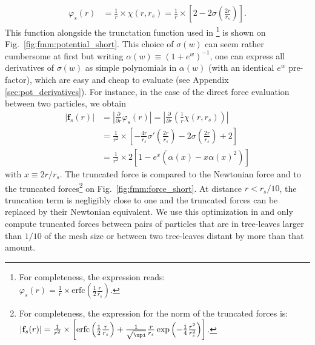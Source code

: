 \begin{align}
  \varphi_s(r) &= \frac{1}{r} \times \chi(r, r_s) = \frac{1}{r}\times\left[2 - 2\sigma\left(\frac{2r}{r_s}\right)\right].%
\end{align}
This function alongside the trunctation function used in
\gadget\footnote{For completeness, the \gadget expression reads:\\
 $\varphi_s(r) = \frac{1}{r} \times \mathrm{erfc}(\frac{1}{2}\frac{r}{r_s})$.} is shown
on Fig.~\ref{fig:fmm:potential_short}. This choice of $\sigma(w)$ can
seem rather cumbersome at first but writing
$\alpha(w) \equiv (1+e^w)^{-1}$, one can express all derivatives of
$\sigma(w)$ as simple polynomials in $\alpha(w)$ (with an identical
$e^w$ pre-factor), which are easy and cheap to evaluate (see Appendix
\ref{sec:pot_derivatives}). For instance, in the case of the direct
force evaluation between two particles, we obtain
\begin{align}
  |\mathbf{f}_s(r)| &= \left|\frac{\partial}{\partial r}\varphi_s(r)\right|
                      = \left|\frac{\partial}{\partial r}\left(\frac{1}{r} \chi(r, r_s)\right) \right|\nonumber \\
  &=  \frac{1}{r^2}\times\left[-\frac{4r}{r_s}\sigma'\left(\frac{2r}{r_s}\right) -
    2\sigma\left(\frac{2r}{r_s}\right) + 2\right] \nonumber \\
  &=
    \frac{1}{r^2}\times 2 \left[1 - e^x\left(\alpha(x) - x\alpha(x)^2\right) \right]
\end{align}
with $x\equiv2r/r_s$. The truncated force is compared to the Newtonian
force and to the \gadget truncated forces\footnote{For completeness,
  the \gadget expression for the norm of the truncated forces is:
  $|\mathbf{f}_s(r)| = \frac{1}{r^2} \times
  \left[\mathrm{erfc}\left(\frac{1}{2}\frac{r}{r_s}\right) +
    \frac{1}{\sqrt{\upi}}\frac{r}{r_s}\exp\left(-\frac{1}{4}\frac{r^2}{r_s^2}\right)\right]$.}
on Fig.~\ref{fig:fmm:force_short}. At distance $r<r_s/10$, the
truncation term is negligibly close to one and the truncated forces
can be replaced by their Newtonian equivalent. We use this
optimization in \swift and only compute truncated forces between pairs
of particles that are in tree-leaves larger than $1/10$ of the mesh
size or between
two tree-leaves distant by more than that amount.\\

